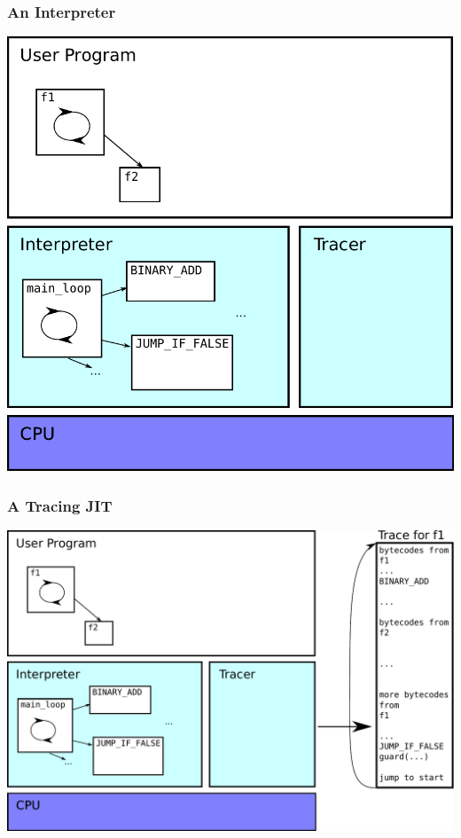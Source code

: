 \documentclass[utf8x]{beamer}
\begin{document}
\begin{frame}
  \frametitle{An Interpreter}
  \includegraphics[scale=0.5]{figures/trace02.pdf}
\end{frame}

\begin{frame}
  \frametitle{A Tracing JIT}
  \includegraphics[scale=0.5]{figures/trace03.pdf}
\end{frame}
\end{document}

